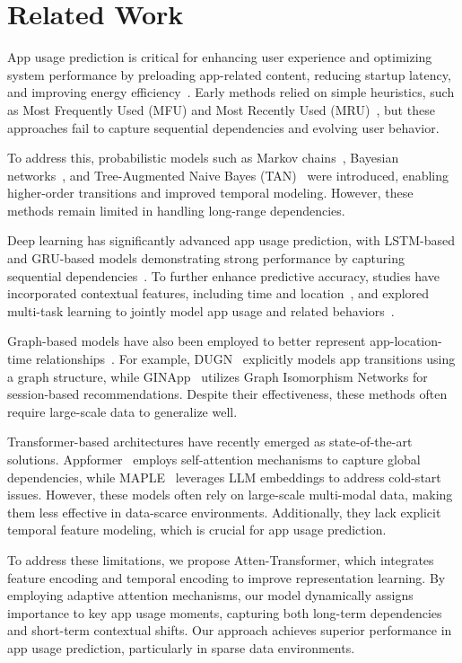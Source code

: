 \section{Related Work}
App usage prediction is critical for enhancing user experience and optimizing system performance by preloading app-related content, reducing startup latency, and improving energy efficiency~\cite{tian2020cohort}. Early methods relied on simple heuristics, such as Most Frequently Used (MFU) and Most Recently Used (MRU)~\cite{shin2012understanding}, but these approaches fail to capture sequential dependencies and evolving user behavior.

To address this, probabilistic models such as Markov chains~\cite{natarajan2013app}, Bayesian networks~\cite{zou2013prophet}, and Tree-Augmented Naive Bayes (TAN)~\cite{baeza2015predicting} were introduced, enabling higher-order transitions and improved temporal modeling. However, these methods remain limited in handling long-range dependencies.

Deep learning has significantly advanced app usage prediction, with LSTM-based and GRU-based models demonstrating strong performance by capturing sequential dependencies~\cite{yang2023atpp, hidasi2015session, alruban2022prediction}. To further enhance predictive accuracy, studies have incorporated contextual features, including time and location~\cite{jiang2019using, wang2021app2vec, khaokaew2021cosem}, and explored multi-task learning to jointly model app usage and related behaviors~\cite{xia2020deepapp, zeng2024ddhcn}.

Graph-based models have also been employed to better represent app-location-time relationships~\cite{yu2020semantic, zhou2020graph, ouyang2022learning, wu2019session, shen2023ginapp,huang2025predicting}. For example, DUGN~\cite{ouyang2022learning} explicitly models app transitions using a graph structure, while GINApp~\cite{shen2023ginapp} utilizes Graph Isomorphism Networks for session-based recommendations.  Despite their effectiveness, these methods often require large-scale data to generalize well.

Transformer-based architectures have recently emerged as state-of-the-art solutions. Appformer~\cite{sun2025appformer} employs self-attention mechanisms to capture global dependencies, while MAPLE~\cite{khaokaew2024maple} leverages LLM embeddings to address cold-start issues. However, these models often rely on large-scale multi-modal data, making them less effective in data-scarce environments. Additionally, they lack explicit temporal feature modeling, which is crucial for app usage prediction.

To address these limitations, we propose Atten-Transformer, which integrates feature encoding and temporal encoding to improve representation learning. By employing adaptive attention mechanisms, our model dynamically assigns importance to key app usage moments, capturing both long-term dependencies and short-term contextual shifts. Our approach achieves superior performance in app usage prediction, particularly in sparse data environments.